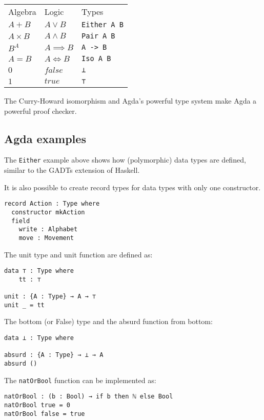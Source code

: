 \begin{table}[H]
\begin{tabular}{lll}
Algebra      & Logic                   & Types \\
$A + B$      & $A \vee B$              & \texttt{Either A B} \\
$A \times B$ & $A \wedge B$            & \texttt{Pair A B}\\
$B^A$        & $ A \implies B$         & \texttt{A -> B} \\
$A = B$      & $ A \iff B$             & \texttt{Iso A B}\\
$0$          & $ false $               & \texttt{⊥}\\
$1$          & $ true  $               & \texttt{⊤}
\end{tabular}
\end{table}


The Curry-Howard isomorphism and Agda's powerful type system make Agda a powerful proof checker.


\subsection{Agda examples}
The \texttt{Either} example above shows how (polymorphic) data types are defined, similar to the GADTs \cite{haskellGADT} extension of Haskell.

It is also possible to create record types for data types with only one constructor.

\begin{verbatim}
record Action : Type where
  constructor mkAction
  field
    write : Alphabet
    move : Movement
\end{verbatim}

The unit type and unit function are defined as:
\begin{verbatim}
data ⊤ : Type where
    tt : ⊤

unit : {A : Type} → A → ⊤
unit _ = tt
\end{verbatim}

The bottom (or False) type and the absurd function from bottom:
\begin{verbatim}
data ⊥ : Type where

absurd : {A : Type} → ⊥ → A
absurd ()
\end{verbatim}

The \texttt{natOrBool} function can be implemented as:
\begin{verbatim}
natOrBool : (b : Bool) → if b then ℕ else Bool
natOrBool true = 0
natOrBool false = true
\end{verbatim}


